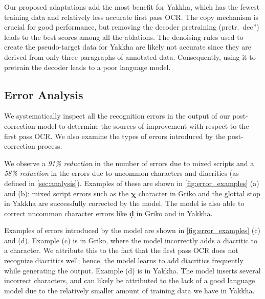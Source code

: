 Our proposed adaptations add the most benefit for Yakkha, which has the fewest training data and relatively less accurate first pass OCR. The copy mechanism is crucial for good performance, but removing the decoder pretraining (\ba\ba pretr.~dec'') leads to the best scores among all the ablations. The denoising rules used to create the pseudo-target data for Yakkha are likely not accurate since they are derived from only three paragraphs of annotated data. Consequently, using it to pretrain the decoder leads to a poor language model.

\subsection{Error Analysis}


We systematically inspect all the recognition errors in the output of our post-correction model to determine the sources of improvement with respect to the first pass OCR. We also examine the types of errors introduced by the post-correction process.

We observe a \emph{91\% reduction} in the number of errors due to mixed scripts and a \emph{58\% reduction} in the errors due to uncommon characters and diacritics (as defined in \autoref{sec:analysis}). Examples of these are shown in \autoref{fig:error_examples} (a) and (b): mixed script errors such as the $\bm{\chi}$ character in Griko and the glottal stop \textbf{\textipa{\textglotstop}} in Yakkha are successfully corrected by the model. The model is also able to correct uncommon character errors like \textbf{\d{d}} in Griko and {} in Yakkha.

Examples of errors introduced by the model are shown in \autoref{fig:error_examples} (c) and (d). Example (c) is in Griko, where the model incorrectly adds a diacritic to a character. We attribute this to the fact that the first pass OCR does not recognize diacritics well; hence, the model learns to add diacritics frequently while generating the output. Example (d) is in Yakkha. The model inserts several incorrect characters, and can likely be attributed to the lack of a good language model due to the relatively smaller amount of training data we have in Yakkha.  
